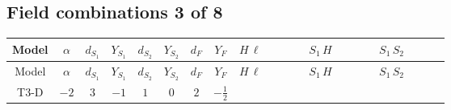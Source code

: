 \documentclass[8pt]{article}
\begin{document}
\begin{landscape}
\subsection*{Field combinations 3 of 8}
\begin{longtable}{@{}cccccccc >{\raggedright\arraybackslash}p{0.21\linewidth} >{\raggedright\arraybackslash}p{0.21\linewidth} >{\raggedright\arraybackslash}p{0.21\linewidth}@{}}
\toprule
Model & $\alpha$ & $d_{S_1}$ & $Y_{S_1}$ & $d_{S_2}$ & $Y_{S_2}$ & $d_F$ & $Y_F$ & $H\,\ell$ & $S_1\,H$ & $S_1\,S_2$ \\
\midrule
\endfirsthead
\toprule
Model & $\alpha$ & $d_{S_1}$ & $Y_{S_1}$ & $d_{S_2}$ & $Y_{S_2}$ & $d_F$ & $Y_F$ & $H\,\ell$ & $S_1\,H$ & $S_1\,S_2$ \\
\midrule
\endhead
T3-D & $-2$ & $3$ & $-1$ & $1$ & $0$ & $2$ & $-\frac{1}{2}$ & \scriptsize\adjustbox{max width=\linewidth}{$\begin{gathered} +\frac{2 \hbar  \overline{y_{1,i_1,r_1}} \overline{y_{2,i_2,r_1}} L_{a_4,i_2}{}^T\, C\, P_L\, L_{a_2,i_1} H_{a_1} H_{a_3} \lambda_5 \epsilon_{a_1,a_2} \epsilon_{a_3,a_4}}{\sqrt{3} \epsilon  M_F} \\ +\frac{2 \hbar  \overline{y_{1,i_1,r_1}} \overline{y_{2,i_2,r_1}} L_{a_4,i_2}{}^T\, C\, P_L\, L_{a_2,i_1} H_{a_1} H_{a_3} \lambda_5 \epsilon_{a_1,a_2} \epsilon_{a_3,a_4}}{\sqrt{3} M_F} \\ +\frac{2 \hbar  \overline{\lambda_5} \overline{L_{a_3,i_1}}\, C\, P_R\, \overline{L_{a_4,i_2}}{}^T y_{1,i_1,r_1} y_{2,i_2,r_1} \epsilon_{a_1,a_3} \epsilon_{a_2,a_4} H_{a_1}{}^{\dagger } H_{a_2}{}^{\dagger }}{\sqrt{3} \epsilon  M_F}\end{gathered}$} & \scriptsize\adjustbox{max width=\linewidth}{$\begin{gathered} -\frac{2 \hbar  \overline{y_{1,i_1,r_1}} \overline{Y_{e,i_2,i_3}} H_{a_1} S_{1,j_1} y_{1,i_2,r_1} Y_{e,i_1,i_3} H_{a_1}{}^{\dagger } S_{1,j_1}{}^{\dagger }}{\sqrt{3} \epsilon } \\ -\frac{2 \hbar  \overline{y_{1,i_1,r_1}} \overline{Y_{e,i_2,i_3}} H_{a_1} S_{1,j_1} y_{1,i_2,r_1} Y_{e,i_1,i_3} H_{a_1}{}^{\dagger } S_{1,j_1}{}^{\dagger }}{\sqrt{3}} \\ -\frac{2 i \sqrt{\frac{2}{3}} \hbar  \overline{y_{1,i_1,r_1}} \overline{Y_{e,i_2,i_3}} H_{a_2} S_{1,j_2} y_{1,i_2,r_1} Y_{e,i_1,i_3} H_{a_1}{}^{\dagger } S_{1,j_1}{}^{\dagger } \mathcal{I}_{H1,a_1,a_2,j_2,j_1}{}^1}{\epsilon }\end{gathered}$} & \scriptsize\adjustbox{max width=\linewidth}{$\begin{gathered} -\frac{4 \hbar  \overline{y_{1,i_1,r_1}} \overline{y_{2,i_2,r_2}} S_2 S_{1,j_1} y_{1,i_2,r_1} y_{2,i_1,r_2} S_2{}^{\dagger } S_{1,j_1}{}^{\dagger }}{\sqrt{3} \epsilon } \\ +\frac{4 \hbar  \overline{y_{1,i_1,r_1}} \overline{y_{2,i_2,r_1}} S_2 S_{1,j_1} y_{1,i_2,r_2} y_{2,i_1,r_2} S_2{}^{\dagger } S_{1,j_1}{}^{\dagger }}{\sqrt{3}} \\ +\frac{4 \hbar  \overline{y_{1,i_1,r_1}} \overline{y_{2,i_2,r_1}} S_2 S_{1,j_1} y_{1,i_1,r_2} y_{2,i_2,r_2} S_2{}^{\dagger } S_{1,j_1}{}^{\dagger }}{\sqrt{3}}\end{gathered}$} \\

\end{longtable}
\end{landscape}
\end{document}
